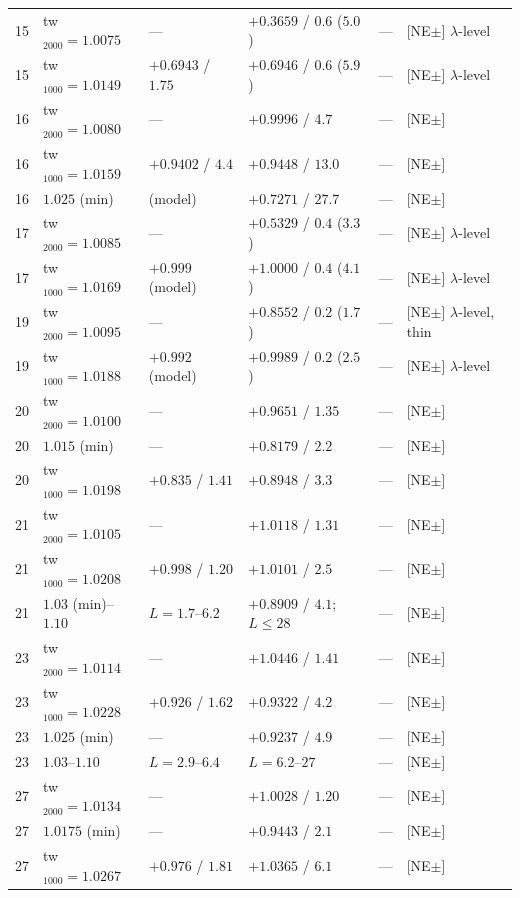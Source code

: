 \documentclass[aps,prl,onecolumn,superscriptaddress,nofootinbib]{revtex4-2}
\begin{document}
\begin{table}[!htbp]
\begin{ruledtabular}
\begin{tabular}{rlllll}
15 & tw$_{2000}=1.0075$ & --- & $+0.3659$ / $0.6$ ($5.0$) & --- & [NE$\pm$] $\lambda$-level\\
15 & tw$_{1000}=1.0149$ & $+0.6943$ / $1.75$ & $+0.6946$ / $0.6$ ($5.9$) & --- & [NE$\pm$] $\lambda$-level\\
16 & tw$_{2000}=1.0080$ & --- & $+0.9996$ / $4.7$ & --- & [NE$\pm$]\\
16 & tw$_{1000}=1.0159$ & $+0.9402$ / $4.4$ & $+0.9448$ / $13.0$ & --- & [NE$\pm$]\\
16 & $1.025$ (min) & (model) & $+0.7271$ / $27.7$ & --- & [NE$\pm$]\\
17 & tw$_{2000}=1.0085$ & --- & $+0.5329$ / $0.4$ ($3.3$) & --- & [NE$\pm$] $\lambda$-level\\
17 & tw$_{1000}=1.0169$ & $+0.999$ (model) & $+1.0000$ / $0.4$ ($4.1$) & --- & [NE$\pm$] $\lambda$-level\\
19 & tw$_{2000}=1.0095$ & --- & $+0.8552$ / $0.2$ ($1.7$) & --- & [NE$\pm$] $\lambda$-level, thin\\
19 & tw$_{1000}=1.0188$ & $+0.992$ (model) & $+0.9989$ / $0.2$ ($2.5$) & --- & [NE$\pm$] $\lambda$-level\\
20 & tw$_{2000}=1.0100$ & --- & $+0.9651$ / $1.35$ & --- & [NE$\pm$]\\
20 & $1.015$ (min) & --- & $+0.8179$ / $2.2$ & --- & [NE$\pm$]\\
20 & tw$_{1000}=1.0198$ & $+0.835$ / $1.41$ & $+0.8948$ / $3.3$ & --- & [NE$\pm$]\\
21 & tw$_{2000}=1.0105$ & --- & $+1.0118$ / $1.31$ & --- & [NE$\pm$]\\
21 & tw$_{1000}=1.0208$ & $+0.998$ / $1.20$ & $+1.0101$ / $2.5$ & --- & [NE$\pm$]\\
21 & $1.03$ (min)--$1.10$ & $L=1.7$--$6.2$ & $+0.8909$ / $4.1$; $L\le28$ & --- & [NE$\pm$]\\
23 & tw$_{2000}=1.0114$ & --- & $+1.0446$ / $1.41$ & --- & [NE$\pm$]\\
23 & tw$_{1000}=1.0228$ & $+0.926$ / $1.62$ & $+0.9322$ / $4.2$ & --- & [NE$\pm$]\\
23 & $1.025$ (min) & --- & $+0.9237$ / $4.9$ & --- & [NE$\pm$]\\
23 & $1.03$--$1.10$ & $L=2.9$--$6.4$ & $L=6.2$--$27$ & --- & [NE$\pm$]\\
27 & tw$_{2000}=1.0134$ & --- & $+1.0028$ / $1.20$ & --- & [NE$\pm$]\\
27 & $1.0175$ (min) & --- & $+0.9443$ / $2.1$ & --- & [NE$\pm$]\\
27 & tw$_{1000}=1.0267$ & $+0.976$ / $1.81$ & $+1.0365$ / $6.1$ & --- & [NE$\pm$]\\

\end{tabular}
\end{ruledtabular}
\end{table}
\end{document}
